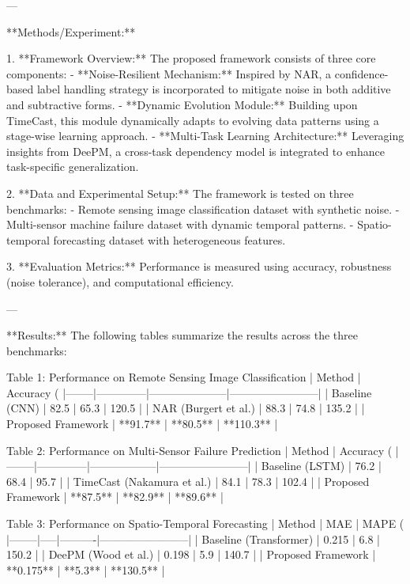 ---

**Methods/Experiment:**  

1. **Framework Overview:**  
   The proposed framework consists of three core components:  
   - **Noise-Resilient Mechanism:** Inspired by NAR, a confidence-based label handling strategy is incorporated to mitigate noise in both additive and subtractive forms.  
   - **Dynamic Evolution Module:** Building upon TimeCast, this module dynamically adapts to evolving data patterns using a stage-wise learning approach.  
   - **Multi-Task Learning Architecture:** Leveraging insights from DeePM, a cross-task dependency model is integrated to enhance task-specific generalization.  

2. **Data and Experimental Setup:**  
   The framework is tested on three benchmarks:  
   - Remote sensing image classification dataset with synthetic noise.  
   - Multi-sensor machine failure dataset with dynamic temporal patterns.  
   - Spatio-temporal forecasting dataset with heterogeneous features.  

3. **Evaluation Metrics:**  
   Performance is measured using accuracy, robustness (noise tolerance), and computational efficiency.  

---

**Results:**  
The following tables summarize the results across the three benchmarks:  

Table 1: Performance on Remote Sensing Image Classification  
| Method | Accuracy (%
|--------|--------------|---------------------|------------------------|  
| Baseline (CNN) | 82.5 | 65.3 | 120.5 |  
| NAR (Burgert et al.) | 88.3 | 74.8 | 135.2 |  
| Proposed Framework | **91.7** | **80.5** | **110.3** |  

Table 2: Performance on Multi-Sensor Failure Prediction  
| Method | Accuracy (%
|--------|--------------|------------------|------------------------|  
| Baseline (LSTM) | 76.2 | 68.4 | 95.7 |  
| TimeCast (Nakamura et al.) | 84.1 | 78.3 | 102.4 |  
| Proposed Framework | **87.5** | **82.9** | **89.6** |  

Table 3: Performance on Spatio-Temporal Forecasting  
| Method | MAE | MAPE (%
|--------|-----|----------|------------------------|  
| Baseline (Transformer) | 0.215 | 6.8 | 150.2 |  
| DeePM (Wood et al.) | 0.198 | 5.9 | 140.7 |  
| Proposed Framework | **0.175** | **5.3** | **130.5** |  

